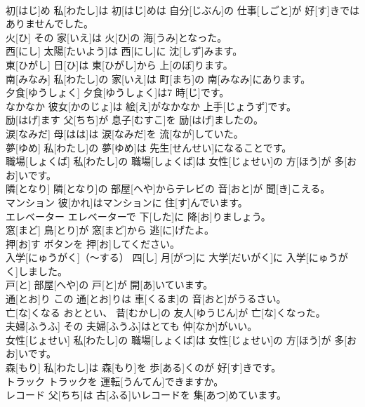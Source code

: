 \documentclass[8pt]{extreport}
\begin{document}
\begin{CJK}{UTF8}{min}
\\	初[はじ]め	私[わたし]は 初[はじ]めは 自分[じぶん]の 仕事[しごと]が 好[す]きではありませんでした。		
\\	火[ひ]	その 家[いえ]は 火[ひ]の 海[うみ]となった。		
\\	西[にし]	太陽[たいよう]は 西[にし]に 沈[しず]みます。		
\\	東[ひがし]	日[ひ]は 東[ひがし]から 上[のぼ]ります。		
\\	南[みなみ]	私[わたし]の 家[いえ]は 町[まち]の 南[みなみ]にあります。		
\\	夕食[ゆうしょく]	夕食[ゆうしょく]は7 時[じ]です。		
\\	なかなか	彼女[かのじょ]は 絵[え]がなかなか 上手[じょうず]です。		
\\	励[はげ]ます	父[ちち]が 息子[むすこ]を 励[はげ]ましたの。		
\\	涙[なみだ]	母[はは]は 涙[なみだ]を 流[なが]していた。		
\\	夢[ゆめ]	私[わたし]の 夢[ゆめ]は 先生[せんせい]になることです。		
\\	職場[しょくば]	私[わたし]の 職場[しょくば]は 女性[じょせい]の 方[ほう]が 多[おお]いです。		
\\	隣[となり]	隣[となり]の 部屋[へや]からテレビの 音[おと]が 聞[き]こえる。		
\\	マンション	彼[かれ]はマンションに 住[す]んでいます。		
\\	エレベーター	エレベーターで 下[した]に 降[お]りましょう。		
\\	窓[まど]	鳥[とり]が 窓[まど]から 逃[に]げたよ。		
\\	押[お]す	ボタンを 押[お]してください。		
\\	入学[にゅうがく]（～する）	四[し] 月[がつ]に 大学[だいがく]に 入学[にゅうがく]しました。		
\\	戸[と]	部屋[へや]の 戸[と]が 開[あ]いています。		
\\	通[とお]り	この 通[とお]りは 車[くるま]の 音[おと]がうるさい。		
\\	亡[な]くなる	おととい、 昔[むかし]の 友人[ゆうじん]が 亡[な]くなった。		
\\	夫婦[ふうふ]	その 夫婦[ふうふ]はとても 仲[なか]がいい。		
\\	女性[じょせい]	私[わたし]の 職場[しょくば]は 女性[じょせい]の 方[ほう]が 多[おお]いです。		
\\	森[もり]	私[わたし]は 森[もり]を 歩[ある]くのが 好[す]きです。		
\\	トラック	トラックを 運転[うんてん]できますか。		
\\	レコード	父[ちち]は 古[ふる]いレコードを 集[あつ]めています。		

\end{CJK}
\end{document}
